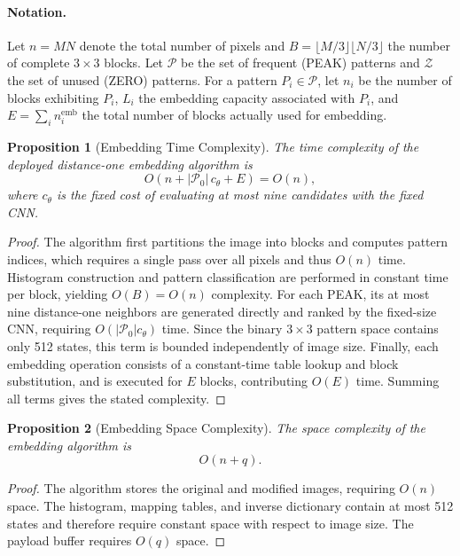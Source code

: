 \documentclass[a4paper,fleqn]{cas-dc}
\newtheorem{proposition}{Proposition}[section]
\begin{document}
\paragraph{Notation.}
Let $n=MN$ denote the total number of pixels and
$B=\lfloor M/3\rfloor\lfloor N/3\rfloor$ the number of complete
$3\times3$ blocks.
Let $\mathcal{P}$ be the set of frequent (PEAK) patterns and
$\mathcal{Z}$ the set of unused (ZERO) patterns.
For a pattern $P_i \in \mathcal{P}$, let $n_i$ be the number of blocks
exhibiting $P_i$, $L_i$ the embedding capacity associated with $P_i$, and
$E = \sum_i n_i^{\text{emb}}$ the total number of blocks actually used for
embedding.

\begin{proposition}[Embedding Time Complexity]
The time complexity of the deployed distance-one embedding algorithm is
\[
O\!\left(n+|\mathcal P_0|\,c_\theta+E\right)=O(n),
\]
where $c_\theta$ is the fixed cost of evaluating at most nine candidates with
the fixed CNN.
\end{proposition}

\begin{proof}
The algorithm first partitions the image into blocks and computes pattern
indices, which requires a single pass over all pixels and thus $O(n)$ time.
Histogram construction and pattern classification are performed in constant
time per block, yielding $O(B)=O(n)$ complexity.
For each PEAK, its at most nine distance-one neighbors are generated directly
and ranked by the fixed-size CNN, requiring
$O(|\mathcal P_0|c_\theta)$ time. Since the binary $3\times3$ pattern space
contains only 512 states, this term is bounded independently of image size.
Finally, each embedding operation consists of a constant-time table lookup and
block substitution, and is executed for $E$ blocks, contributing $O(E)$ time.
Summing all terms gives the stated complexity.
\end{proof}

\begin{proposition}[Embedding Space Complexity]
The space complexity of the embedding algorithm is
\[
O(n+q).
\]
\end{proposition}

\begin{proof}
The algorithm stores the original and modified images, requiring $O(n)$ space.
The histogram, mapping tables, and inverse dictionary contain at most 512
states and therefore require constant space with respect to image size. The
payload buffer requires $O(q)$ space.
\end{proof}
\end{document}
